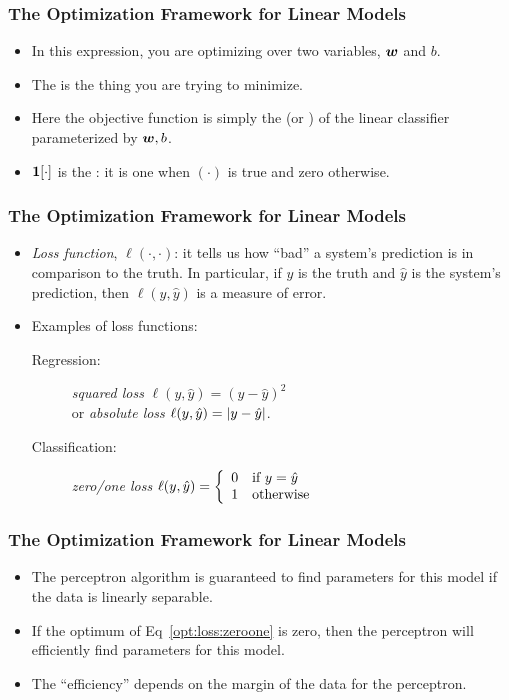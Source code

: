 \documentclass[trans]{beamer}
\begin{document}
\begin{frame}
  \frametitle{The Optimization Framework for Linear Models}
\begin{itemize}
\item 
In this expression, you are optimizing over two variables, $\vw$ and
$b$. 
\item The  is the thing you are trying to
minimize. 
\item Here the objective function is simply the
 (or ) of the linear classifier
parameterized by $\vw,b$. 
\item $\Ind[\cdot]$ is the
: it is one when $(\cdot)$ is true and
zero otherwise.
\end{itemize}
\end{frame}

\begin{frame}
  \frametitle{The Optimization Framework for Linear Models}
\begin{itemize}
\item \emph{Loss function}, $\ell(\cdot,\cdot)$: 
it tells us how ``bad'' a system's prediction is in
comparison to the truth.  In particular, if $y$ is the truth and $\hat
y$ is the system's prediction, then $\ell(y,\hat y)$ is a measure of
error.
\item
Examples of loss functions:

\begin{description}
\item[Regression:] \emph{squared loss} $\ell(y,\hat y) = (y - \hat
  y)^2$\\ or \emph{absolute loss} $\ell(y,\hat y) = \ab{y - \hat y}$.

\item[Classification:] \emph{zero/one loss} $\ell(y,\hat y)
  = \brack{0 & \text{if } y = \hat y\\ 1 & \text{otherwise}}$

\end{description}
\end{itemize}
\end{frame}

\begin{frame}
  \frametitle{The Optimization Framework for Linear Models}
\begin{itemize}
\item 
The perceptron algorithm is guaranteed to find parameters
for this model if the data is linearly separable.  
\item If
the optimum of Eq~\eqref{opt:loss:zeroone} is zero, then the
perceptron will efficiently find parameters for this model. 
\item The
 ``efficiency'' depends on the margin of the data for the
perceptron.
\end{itemize}
\end{frame}
\end{document}
